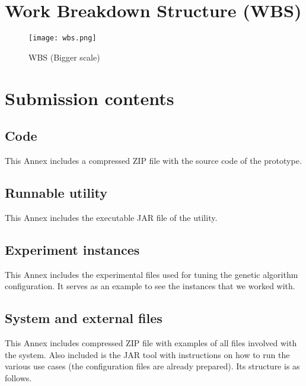 \section{Work Breakdown Structure (WBS)}


\begin{figure}[H]
    \caption{WBS (Bigger scale)}
  \centering
  \texttt{[image: wbs.png]}
\end{figure}



\section{Submission contents}

\subsection{Code}

This Annex includes a compressed ZIP file with the source code of the prototype.


\subsection{Runnable utility}

This Annex includes the executable JAR file of the utility.


\subsection{Experiment instances}

This Annex includes the experimental files used for tuning the genetic algorithm configuration. It serves as an example to see the instances that we worked with.


\subsection{System and external files}\label{annex-file-format}

This Annex includes compressed ZIP file with examples of all files involved with the system. Also included is the JAR tool with instructions on how to run the various use cases (the configuration files are already prepared). Its structure is as follows.

